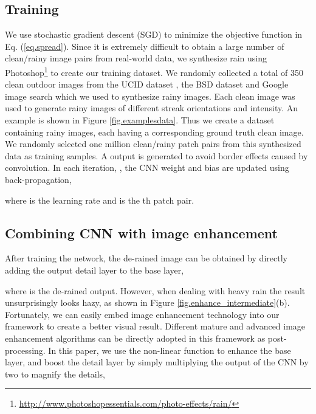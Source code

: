 \documentclass[journal]{IEEEtran}
\begin{document}
\subsection{Training}
We use stochastic gradient descent (SGD) to minimize the objective function in Eq. (\ref{eq.spread}). Since it is extremely difficult to obtain a large number of clean/rainy image pairs from real-world data, we synthesize rain using Photoshop\footnote{\url{http://www.photoshopessentials.com/photo-effects/rain/}} to create our training dataset. We randomly collected a total of 350 clean outdoor images from the UCID dataset \cite{27}, the BSD dataset \cite{31} and Google image search which we used to synthesize rainy images. Each clean image was used to generate  rainy images of different streak orientations and intensity. An example is shown in Figure \ref{fig.examplesdata}. Thus we create a dataset containing  rainy images, each having a corresponding ground truth clean image. We randomly selected one million  clean/rainy patch pairs from this synthesized data as training samples. A  output is generated to avoid border effects caused by convolution. In 
each iteration, , the CNN weight and bias are updated using back-propagation,

where  is the learning rate and   is the th patch pair.


\subsection{Combining CNN with image enhancement}
\label{sec.enhancement}
After training the network, the de-rained image can be obtained by directly adding the output detail layer to the base layer,

where  is the de-rained output. However, when dealing with heavy rain the result unsurprisingly looks hazy, as shown in Figure \ref{fig.enhance_intermediate}(b). Fortunately, we can easily embed image enhancement technology into our framework to create a better visual result. Different mature and advanced image enhancement algorithms can be directly adopted in this framework as post-processing. In this paper, we use the non-linear function \cite{28} to enhance the base layer, and boost the detail layer by simply multiplying the output of the CNN by two to magnify the details,
\end{document}
